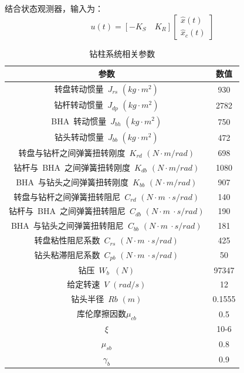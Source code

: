 \documentclass[12pt,hyperref,a4paper,UTF8]{ctexart}
\begin{document}
	结合状态观测器，输入为：
	\begin{equation}
		u(t)=[-K_{S}\quad K_{R}]\begin{bmatrix} \hat{x}(t)\\ \hat{x}_{c}(t) \end{bmatrix} 
	\end{equation}
	
	\begin{table}[htbp!]
		\centering
		\caption{钻柱系统相关参数}
		\begin{tabular}{cc} 
			\toprule
			参数                                                 & 数值      \\ 
			\hline
			转盘转动惯量~${J}_{rs}$ $(kg·m^2)$               & 930     \\
			钻杆转动惯量~${J}_{dp}$ $(kg·m^2)$               & 2782    \\
			BHA~转动惯量~${J}_{bh} $ $(kg·m^2)$             & 750     \\
			钻头转动惯量~${J}_{bb}$ $(kg·m^2)$               & 472     \\
			转盘与钻杆之间弹簧扭转刚度~${K}_{rd}$ $(N·m/rad)$      & 698     \\
			钻杆与~BHA~之间弹簧扭转刚度~${K}_{db}$ $(N·m/rad)$   & 1080    \\
			BHA~与钻头之间弹簧扭转刚度~${K}_{bb}$ $(N·m/rad)$    & 907     \\
			转盘与钻杆之间弹簧扭转阻尼~${C}_{rd}$ $(N·m~·s/rad)$   & 140     \\
			钻杆与~BHA~之间弹簧扭转阻尼~${C}_{db}$ $(N·m~·s/rad)$& 190     \\
			BHA~与钻头之间弹簧扭转阻尼~${C}_{bb}$ $(N·m~·s/rad)$ & 181     \\
			转盘粘性阻尼系数~${C}_{rs}$ $(N·m~·s/rad)$        & 425     \\
			钻头粘滞阻尼系数~${C}_{pb}$ $(N·m~·s/rad)$        & 50      \\
			钻压~${W}_b~$ ${(N)}$                        & 97347   \\
			给定转速~$V$ $(rad/s) $                            & 12      \\
			钻头半径~${R}b$ ${(m)} $                      & 0.1555  \\
			库伦摩擦因数${\mu _{cb}} $                                & 0.5     \\
			${\xi}$                                         & 10-6    \\
			${\mu _{sb}}$                                       & 0.8     \\
			${\gamma_b}  $                                      & 0.9     \\
			\bottomrule
		\end{tabular}
	\end{table}
	
\end{document}
